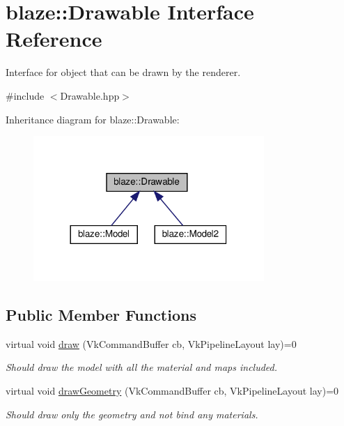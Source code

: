 \hypertarget{classblaze_1_1Drawable}{}\section{blaze\+:\+:Drawable Interface Reference}
\label{classblaze_1_1Drawable}


Interface for object that can be drawn by the renderer.  




{\ttfamily \#include $<$Drawable.\+hpp$>$}



Inheritance diagram for blaze\+:\+:Drawable\+:\nopagebreak
\begin{figure}[H]
\begin{center}
\leavevmode
\includegraphics[width=248pt]{classblaze_1_1Drawable__inherit__graph}
\end{center}
\end{figure}
\subsection*{Public Member Functions}
\begin{DoxyCompactItemize}
\item 
virtual void \hyperlink{classblaze_1_1Drawable_a810b411ced93f27781a40a170714b590}{draw} (Vk\+Command\+Buffer cb, Vk\+Pipeline\+Layout lay)=0
\begin{DoxyCompactList}\small\item\em Should draw the model with all the material and maps included. \end{DoxyCompactList}\item 
virtual void \hyperlink{classblaze_1_1Drawable_aa2bd171547027319e4254c47e0628163}{draw\+Geometry} (Vk\+Command\+Buffer cb, Vk\+Pipeline\+Layout lay)=0
\begin{DoxyCompactList}\small\item\em Should draw only the geometry and not bind any materials. \end{DoxyCompactList}\end{DoxyCompactItemize}


